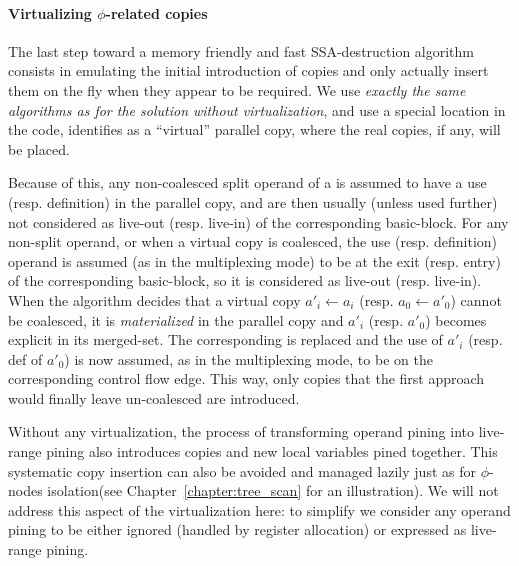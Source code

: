 \paragraph{Virtualizing $\phi$-related copies}
The last step toward a memory friendly and fast SSA-destruction algorithm consists in emulating the initial introduction of copies and only actually insert them on the fly when they appear to be required. We use \emph{exactly the same algorithms as for the solution without virtualization}, and use a special location in the code, identifies as a ``virtual'' parallel copy, where the real copies, if any, will be placed. 

Because of this, any non-coalesced split operand of a \phifun is assumed to have a use (resp. definition) in the parallel copy, and are then usually (unless used further) not considered as live-out (resp. live-in) of the corresponding basic-block. 
For any non-split operand, or when a virtual copy is coalesced, the use (resp. definition) operand is assumed (as in the multiplexing mode) to be at the exit (resp. entry) of the corresponding basic-block, so it is considered as live-out (resp. live-in). 
When the algorithm decides that a virtual copy $a'_i \gets a_i$ (resp. $a_0 \gets a'_0$)  cannot be coalesced, it is \emph{materialized} in the parallel copy and $a'_i$ (resp. $a'_0$) becomes explicit in its merged-set. 
The corresponding \phiop is replaced and the use of $a'_i$ (resp. def of $a'_0$) is now assumed, as in the multiplexing mode, to be on the corresponding control flow edge. 
This way, only copies that the first approach would finally leave un-coalesced are introduced. 


Without any virtualization, the process of transforming operand pining into live-range pining also introduces copies and new local variables pined together. This systematic copy insertion can also be avoided and managed lazily just as for $\phi$-nodes isolation\ifhab (see Chapter~\ref{chapter:tree_scan} for an illustration)\fi. We will not address this aspect of the virtualization here: to simplify we consider any operand pining to be either ignored (handled by register allocation) or expressed as live-range pining.

